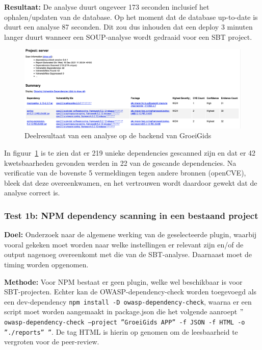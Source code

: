 \textbf{Resultaat:} De analyse duurt ongeveer 173 seconden inclusief het ophalen/updaten van de database. Op het moment dat de database up-to-date is duurt een analyse 87 seconden. Dit zou dus inhouden dat een deploy 3 minuten langer duurt wanneer een SOUP-analyse wordt gedraaid voor een SBT project.
\begin{figure}
    \myfloatalign
    \includegraphics[width=15cm]{gfx/report_analyse_test1a_SBT}
    \caption{Deelresultaat van een analyse op de backend van GroeiGids}
    \label{fig:SBTReport1A}
\end{figure}

In figuur~\ref{fig:SBTReport1A} is te zien dat er 219 unieke dependencies gescanned zijn en dat er 42 kwetsbaarheden gevonden werden in 22 van de gescande dependencies. Na verificatie van de bovenste 5 vermeldingen tegen andere bronnen (openCVE), bleek dat deze overeenkwamen, en het vertrouwen wordt daardoor gewekt dat de analyse correct is.

\subsubsection{Test 1b: NPM dependency scanning in een bestaand project}

\textbf{Doel:} Onderzoek naar de algemene werking van de geselecteerde plugin, waarbij vooral gekeken moet worden naar welke instellingen er relevant zijn en/of de output nagenoeg overeenkomt met die van de SBT-analyse. Daarnaast moet de timing worden opgenomen.

\textbf{Methode:} Voor NPM bestaat er geen plugin, welke wel beschikbaar is voor SBT-projecten. Echter kan de OWASP-dependency-check worden toegevoegd als een dev-dependency \texttt{npm install -D owasp-dependency-check}, waarna er een script moet worden aangemaakt in package.json die het volgende aanroept \texttt{$"$owasp-dependency-check --project ''GroeiGids APP'' -f JSON -f HTML -o ''./reports'' ''}. De tag HTML is hierin op genomen om de leesbaarheid te vergroten voor de peer-review.

